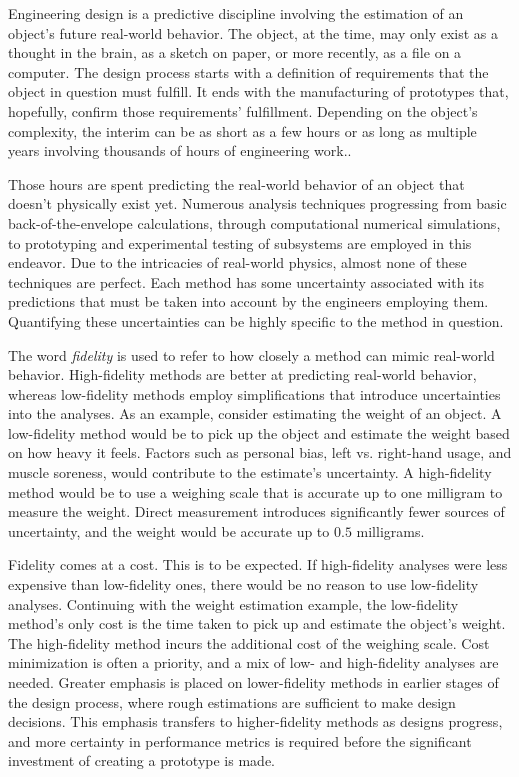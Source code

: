Engineering design is a predictive discipline involving the estimation of an object's future real-world behavior.
The object, at the  time, may only exist as a thought in the brain, as a sketch on paper, or more recently, as a file on a computer.
The design process starts with a definition of requirements that the object in question must fulfill.
It ends with the manufacturing of prototypes that, hopefully, confirm those requirements' fulfillment. 
Depending on the object's complexity, the interim can be as short as a few hours or as long as multiple years involving thousands of hours of engineering work..

Those hours are spent predicting the real-world behavior of an object that doesn't physically exist yet.
Numerous analysis techniques progressing from basic back-of-the-envelope calculations, through computational numerical simulations, to prototyping and experimental testing of subsystems are employed in this endeavor.
Due to the intricacies of real-world physics, almost none of these techniques are perfect.
Each method has some uncertainty associated with its predictions that must be taken into account by the engineers employing them.
Quantifying these uncertainties can be highly specific to the method in question.

The word \textit{fidelity} is used to refer to how closely a method can mimic real-world behavior.
High-fidelity methods are better at predicting real-world behavior, whereas low-fidelity methods employ simplifications that introduce uncertainties into the analyses.
As an example, consider estimating the weight of an object.
A low-fidelity method would be to pick up the object and estimate the weight based on how heavy it feels.
Factors such as personal bias, left vs. right-hand usage, and muscle soreness, would contribute to the estimate's uncertainty.
A high-fidelity method would be to use a weighing scale that is accurate up to one milligram to measure the weight.
Direct measurement introduces significantly fewer sources of uncertainty, and the weight would be accurate up to $0.5$ milligrams. 

Fidelity comes at a cost.
This is to be expected. 
If high-fidelity analyses were less expensive than low-fidelity ones, there would be no reason to use low-fidelity analyses. 
Continuing with the weight estimation example, the low-fidelity method's only cost is the time taken to pick up and estimate the object's weight.
The high-fidelity method incurs the additional cost of the weighing scale.
Cost minimization is often a priority, and a mix of low- and high-fidelity analyses are needed.
Greater emphasis is placed on lower-fidelity methods in earlier stages of the design process, where rough estimations are sufficient to make design decisions.
This emphasis transfers to higher-fidelity methods as designs progress, and more certainty in performance metrics is required before the significant investment of creating a prototype is made.

